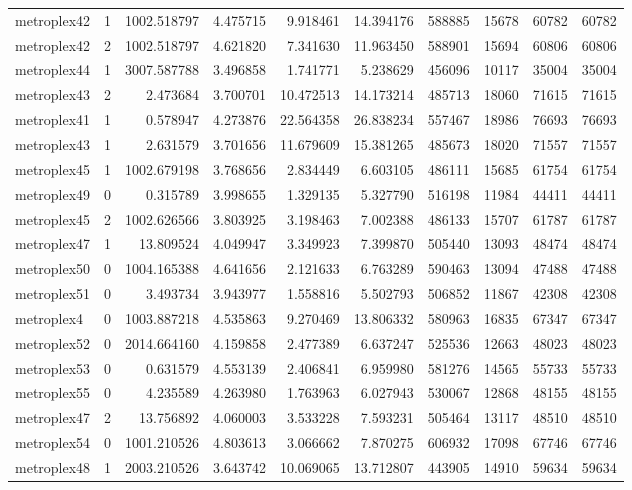 \begin{longtable}{|l|r|r|r|r|r|r|r|r|r|}
metroplex42 & 1 & 1002.518797 & 4.475715 & 9.918461 & 14.394176 & 588885 & 15678 & 60782 & 60782 \\
metroplex42 & 2 & 1002.518797 & 4.621820 & 7.341630 & 11.963450 & 588901 & 15694 & 60806 & 60806 \\
metroplex44 & 1 & 3007.587788 & 3.496858 & 1.741771 & 5.238629 & 456096 & 10117 & 35004 & 35004 \\
metroplex43 & 2 & 2.473684 & 3.700701 & 10.472513 & 14.173214 & 485713 & 18060 & 71615 & 71615 \\
metroplex41 & 1 & 0.578947 & 4.273876 & 22.564358 & 26.838234 & 557467 & 18986 & 76693 & 76693 \\
metroplex43 & 1 & 2.631579 & 3.701656 & 11.679609 & 15.381265 & 485673 & 18020 & 71557 & 71557 \\
metroplex45 & 1 & 1002.679198 & 3.768656 & 2.834449 & 6.603105 & 486111 & 15685 & 61754 & 61754 \\
metroplex49 & 0 & 0.315789 & 3.998655 & 1.329135 & 5.327790 & 516198 & 11984 & 44411 & 44411 \\
metroplex45 & 2 & 1002.626566 & 3.803925 & 3.198463 & 7.002388 & 486133 & 15707 & 61787 & 61787 \\
metroplex47 & 1 & 13.809524 & 4.049947 & 3.349923 & 7.399870 & 505440 & 13093 & 48474 & 48474 \\
metroplex50 & 0 & 1004.165388 & 4.641656 & 2.121633 & 6.763289 & 590463 & 13094 & 47488 & 47488 \\
metroplex51 & 0 & 3.493734 & 3.943977 & 1.558816 & 5.502793 & 506852 & 11867 & 42308 & 42308 \\
metroplex4 & 0 & 1003.887218 & 4.535863 & 9.270469 & 13.806332 & 580963 & 16835 & 67347 & 67347 \\
metroplex52 & 0 & 2014.664160 & 4.159858 & 2.477389 & 6.637247 & 525536 & 12663 & 48023 & 48023 \\
metroplex53 & 0 & 0.631579 & 4.553139 & 2.406841 & 6.959980 & 581276 & 14565 & 55733 & 55733 \\
metroplex55 & 0 & 4.235589 & 4.263980 & 1.763963 & 6.027943 & 530067 & 12868 & 48155 & 48155 \\
metroplex47 & 2 & 13.756892 & 4.060003 & 3.533228 & 7.593231 & 505464 & 13117 & 48510 & 48510 \\
metroplex54 & 0 & 1001.210526 & 4.803613 & 3.066662 & 7.870275 & 606932 & 17098 & 67746 & 67746 \\
metroplex48 & 1 & 2003.210526 & 3.643742 & 10.069065 & 13.712807 & 443905 & 14910 & 59634 & 59634 \\

\end{longtable}
